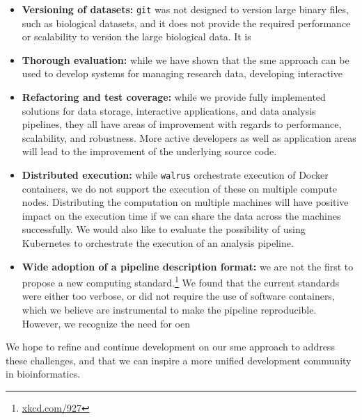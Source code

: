 \begin{itemize} 

\item \textbf{Versioning of datasets:} \texttt{git} was not designed to version
large binary files, such as biological datasets, and it does not provide the
required performance or scalability to version the large biological data. It is 


\item \textbf{Thorough evaluation:} while we have shown that the \gls{sme}
approach can be used to develop systems for managing research data, developing
interactive 

\item \textbf{Refactoring and test coverage:} while we provide fully implemented
solutions for data storage, interactive applications, and data analysis
pipelines, they all have areas of improvement with regards to performance,
scalability, and robustness. More active developers as well as application areas
will lead to the improvement of the underlying source code. 

\item \textbf{Distributed execution:} while \texttt{walrus} orchestrate
execution of Docker containers, we do not support the execution of these on
multiple compute nodes. Distributing the computation on multiple machines will
have positive impact on the execution time if we can share the data across the
machines successfully. We would also like to evaluate the possibility of using
Kubernetes to orchestrate the execution of an analysis pipeline. 


\item \textbf{Wide adoption of a pipeline description format:} we are not the
first to propose a new computing standard.\footnote{\url{xkcd.com/927}} We found
that the current standards were either too verbose, or did not require the use
of software containers, which we believe are instrumental to make the pipeline
reproducible. However, we recognize the need for oen 

\end{itemize} 

We hope to refine and continue development on our \gls{sme} approach to address
these challenges, and that we can inspire a more unified development community
in bioinformatics. 
